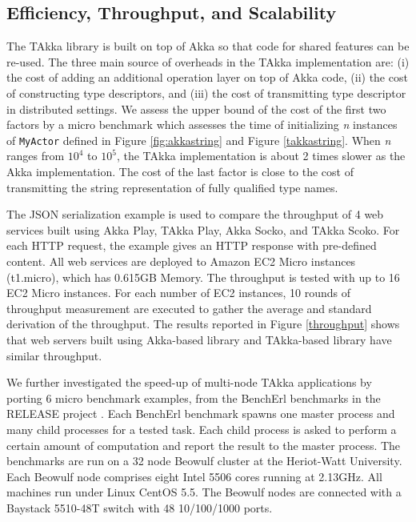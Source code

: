 \subsection{Efficiency, Throughput, and Scalability}
\label{efficiency}

The TAkka library is built on top of Akka so that code for shared features 
can be re-used.  The three main source of overheads in the TAkka implementation
are: (i) the cost of adding an additional operation layer on top of Akka 
code, (ii) the cost of constructing type descriptors, and (iii) the cost of 
transmitting type descriptor in distributed settings. We assess the upper bound 
of the cost of the first two factors by a micro benchmark which assesses the 
time of initializing {\it n} instances of {\tt MyActor} defined in Figure
\ref{fig:akkastring} and Figure \ref{takkastring}. When {\it n} ranges from 
$10^4$ to $10^5$, the TAkka implementation is about 2 times slower as
the Akka implementation.  The cost of the last factor is close to the cost of
transmitting the string representation of fully qualified type names.



The JSON serialization example \citep{techempower} is used to compare the 
throughput of 4 web services built using Akka Play, TAkka Play, Akka 
Socko, and TAkka Scoko.  For each HTTP request, the example gives an 
HTTP response with pre-defined content.  All web services are deployed to 
Amazon EC2 Micro instances (t1.micro), which has 0.615GB Memory. The throughput 
is tested with up to 16 EC2 Micro instances.  For each number of EC2 instances, 
10 rounds of throughput measurement are executed to gather the average and 
standard derivation of the throughput. The results reported in Figure 
\ref{throughput} shows that web servers built using Akka-based library and 
TAkka-based library have similar throughput.

We further investigated the speed-up of multi-node TAkka applications by 
porting 6 micro benchmark examples, from the BenchErl benchmarks in the RELEASE 
project \citep{RELEASE}.  Each BenchErl benchmark spawns one master process and 
many child processes for a tested task.  Each child process is asked to perform 
a certain amount of computation and report the result to the master process.  
The benchmarks are run on a 32 node Beowulf cluster at the Heriot-Watt 
University. Each Beowulf node comprises eight Intel 5506 cores running at
2.13GHz. All machines run under Linux CentOS 5.5. The Beowulf nodes are
connected with a Baystack 5510-48T switch with 48 10/100/1000 ports.

